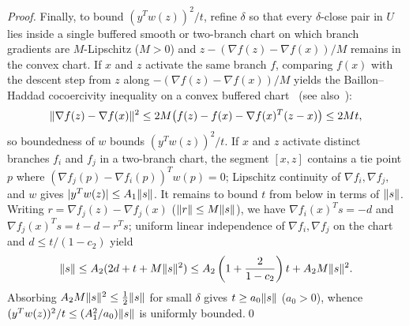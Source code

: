 \begin{proof}
Finally, to bound $(y^Tw(z))^2/t$, refine $\delta$ so that every $\delta$-close
pair in $U$ lies inside a single buffered smooth or two-branch chart on which
branch gradients are $M$-Lipschitz ($M>0$) and $z-(\nabla f(z)-\nabla f(x))/M$
remains in the convex chart. If $x$ and $z$ activate the same branch $f$,
comparing $f(x)$ with the descent step from $z$ along
$-(\nabla f(z)-\nabla f(x))/M$ yields the Baillon--Haddad cocoercivity
inequality on a convex buffered chart~\cite{WW}
(see also~):
\[
 \lVert\nabla f(z)-\nabla f(x)\rVert^2
 \le2M\bigl(f(z)-f(x)-\nabla f(x)^T(z-x)\bigr)\le2Mt,
\]
so boundedness of $w$ bounds $(y^Tw(z))^2/t$. If $x$ and $z$ activate distinct
branches $f_i$ and $f_j$ in a two-branch chart, the segment $[x,z]$ contains a
tie point $p$ where $(\nabla f_j(p)-\nabla f_i(p))^Tw(p)=0$; Lipschitz
continuity of $\nabla f_i,\nabla f_j,$ and $w$ gives $|y^Tw(z)|\le A_1\lVert s\rVert$.
It remains to bound $t$ from below in terms of $\lVert s\rVert$. Writing
$r=\nabla f_j(z)-\nabla f_j(x)$ ($\lVert r\rVert\le M\lVert s\rVert$), we
have $\nabla f_i(x)^Ts=-d$ and $\nabla f_j(x)^Ts=t-d-r^Ts$; uniform linear
independence of $\nabla f_i,\nabla f_j$ on the chart and $d\le t/(1-c_2)$ yield
\[
 \lVert s\rVert\le A_2(2d+t+M\lVert s\rVert^2)
 \le A_2\left(1+\frac{2}{1-c_2}\right)t+A_2M\lVert s\rVert^2.
\]
Absorbing $A_2M\lVert s\rVert^2\le\tfrac12\lVert s\rVert$ for small $\delta$ gives
$t\ge a_0\lVert s\rVert$ ($a_0>0$), whence $(y^Tw(z))^2/t\le(A_1^2/a_0)\lVert s\rVert$ is
uniformly bounded.\qed
\end{proof}
